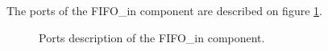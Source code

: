 \documentclass[11pt]{article}
\begin{document}
The ports of the FIFO\_in component are described on figure \ref{fifo_in_ports}.
\begin{figure}[H]
        \caption{Ports description of the FIFO\_in component.}
        \label{fifo_in_ports}
\end{figure}
\end{document}
